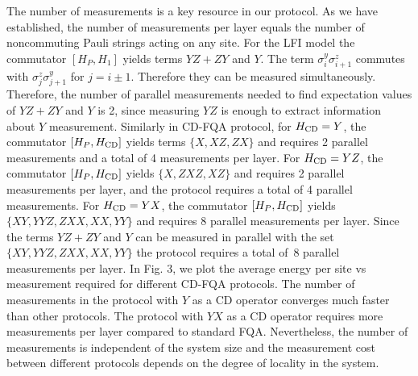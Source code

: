 \documentclass[groupedaddress,prx,floats,superscriptaddress,notitlepages,12pt]{revtex4-2}
\begin{document}
{The number of measurements is a key resource in our protocol. As
we have established, the number of measurements per layer equals
the number of noncommuting Pauli strings acting on any site. For
the LFI model the commutator $[H_P, H_1]$ yields terms $YZ+ZY$
and $Y$. The term $\sigma_{i}^y\sigma_{i+1}^z$ commutes with
$\sigma_{j}^z\sigma_{j+1}^y$ for $j = i \pm 1$.
Therefore they can be measured
simultaneously. Therefore, the number of parallel
measurements needed to find expectation values of $YZ+ZY$ and
$Y$ is 2, since measuring $YZ$ is enough to extract information about $Y$ measurement.
Similarly in CD-FQA protocol, for $H_{\rm CD}=Y$, the
commutator $[H_P, H_{\rm CD}]$ yields terms $\{X, XZ, ZX\}$ and requires 2 parallel measurements and a
total of 4 measurements per layer. For $H_{\rm CD}=YZ$, the
commutator $[H_P, H_{\rm CD}]$ yields $\{X, ZXZ, XZ\}$ and
requires 2 parallel measurements per layer, and the protocol
requires a total of 4 parallel measurements. For $H_{\rm
CD}=YX$, the commutator $[H_P, H_{\rm CD}]$ yields $\{XY, YYZ,
ZXX, XX, YY\}$ and requires 8 parallel measurements per layer.
Since the terms $YZ+ZY$ and $Y$ can be measured in parallel with
the set $\{XY, YYZ,  ZXX, XX, YY\}$ the protocol requires a total of~8 parallel measurements per layer. In Fig. 3, we plot
the average energy per site vs measurement required for
different CD-FQA protocols. The number of measurements in the
protocol with $Y$ as a CD operator converges much faster than
other protocols. The protocol with $YX$ as a CD operator requires more measurements per layer compared to standard FQA. Nevertheless, the number of measurements is independent of the system size and the measurement cost between different protocols depends on the degree of locality in the system.
}


\end{document}
